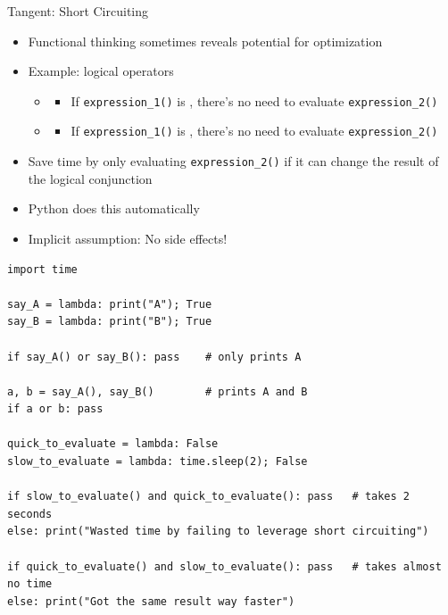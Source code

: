 \begin{frame}{Tangent: Short Circuiting}
%
\begin{itemize}
\item Functional thinking sometimes reveals potential for optimization
\item Example: logical operators
	\begin{itemize}
	\item {}
		\begin{itemize}
		\item If \texttt{expression\_1()} is , there's no need to evaluate \texttt{expression\_2()}
		\end{itemize}
	\item {}
		\begin{itemize}
		\item If \texttt{expression\_1()} is , there's no need to evaluate \texttt{expression\_2()}
		\end{itemize}
	\end{itemize}
\item[\Thus] Save time by only evaluating \texttt{expression\_2()} if it can change the result of the logical conjunction
\item[\Thus] Python does this automatically
\item[\Thus] Implicit assumption: No side effects!
\end{itemize}
%
\end{frame}


\begin{frame}[fragile]
%
\begin{codebox}
\begin{verbatim}
import time

say_A = lambda: print("A"); True
say_B = lambda: print("B"); True

if say_A() or say_B(): pass    # only prints A

a, b = say_A(), say_B()        # prints A and B
if a or b: pass

quick_to_evaluate = lambda: False
slow_to_evaluate = lambda: time.sleep(2); False

if slow_to_evaluate() and quick_to_evaluate(): pass   # takes 2 seconds
else: print("Wasted time by failing to leverage short circuiting")

if quick_to_evaluate() and slow_to_evaluate(): pass   # takes almost no time
else: print("Got the same result way faster")
\end{verbatim}
\end{codebox}
%
\end{frame}

